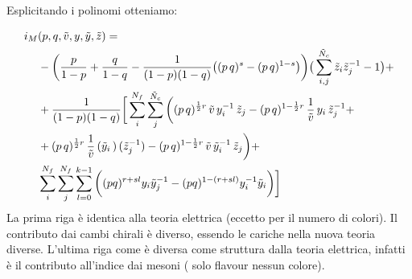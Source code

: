 \documentclass[a4paper,12pt]{article}
\begin{document}
Esplicitando i polinomi otteniamo:

\begin{align*}
 i_M &(p,q, \tilde v, y,\tilde y ,\tilde z) = \\ 
& -\bigg({p \over 1-p}+{q \over 1-q} -{1 \over (1-p)(1-q)} \big((p\,q)^{s}- (p\,q)^{1-s}\big)
\bigg) \big( \sum_{i,j}^{\tilde N_c} \tilde z_i \tilde z_j^{-1} -1\big ) + \\ 
& +{1\over (1-p)(1-q)}\bigg[ \sum_i^{N_f}\sum_j^{\tilde N_c} \bigg( (p\,q)^{{1 \over 2 } r} \,\tilde v \, y_i^{-1}\, \tilde z_j
- (p\,q)^{1- {1\over 2}r} \, {1 \over \tilde v}\, y_i \,   
\tilde z_j^{-1} + \\
& + (p\,q)^{{1 \over 2 } r}\, {1\over \tilde v}\, 
({\tilde y_i}\,) \,  
(\tilde z_j^{-1})
- (p\,q)^{1-  {1\over 2}r} \, \tilde v \, 
{\tilde y_i}^{-1} \, 
\tilde z_j \bigg) + \\
 &\sum_i^{N_f} \sum_j^{N_f} \sum_{l=0}^{k-1}   \bigg(  (pq)^{ r + s l  } y_i \tilde y_j^{-1}   - (pq)^{1 -( r + s l )}
y_i^{-1}  {\tilde y_i}  \bigg) \bigg] \\
\end{align*}
La prima riga è identica alla teoria elettrica (eccetto per il numero di colori).
Il contributo dai cambi chirali è diverso, essendo le cariche nella nuova teoria diverse.
L'ultima riga come è diversa come struttura dalla teoria elettrica, infatti è il contributo all'indice dai mesoni ( solo flavour nessun colore).
\end{document}
